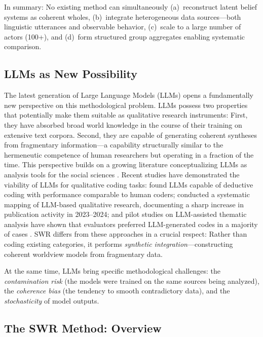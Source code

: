 \documentclass[11pt,a4paper]{article}
\theoremstyle{definition}
\theoremstyle{plain}
\theoremstyle{remark}
\begin{document}
In summary: No existing method can simultaneously (a)~reconstruct latent belief systems as coherent wholes, (b)~integrate heterogeneous data sources---both linguistic utterances and observable behavior, (c)~scale to a large number of actors (100+), and (d)~form structured group aggregates enabling systematic comparison.

\subsection{LLMs as New Possibility}
\label{sec:llms}

The latest generation of Large Language Models (LLMs) opens a fundamentally new perspective on this methodological problem. LLMs possess two properties that potentially make them suitable as qualitative research instruments: First, they have absorbed broad world knowledge in the course of their training on extensive text corpora. Second, they are capable of generating coherent syntheses from fragmentary information---a capability structurally similar to the hermeneutic competence of human researchers but operating in a fraction of the time. This perspective builds on a growing literature conceptualizing LLMs as analysis tools for the social sciences \citep{Ziems2024, Bail2024, Argyle2023}. Recent studies have demonstrated the viability of LLMs for qualitative coding tasks: \citet{Tai2024} found LLMs capable of deductive coding with performance comparable to human coders; \citet{Barros2024} conducted a systematic mapping of LLM-based qualitative research, documenting a sharp increase in publication activity in 2023--2024; and pilot studies on LLM-assisted thematic analysis have shown that evaluators preferred LLM-generated codes in a majority of cases \citep{Wang2025}. SWR differs from these approaches in a crucial respect: Rather than coding existing categories, it performs \emph{synthetic integration}---constructing coherent worldview models from fragmentary data.

At the same time, LLMs bring specific methodological challenges: the \emph{contamination risk} (the models were trained on the same sources being analyzed), the \emph{coherence bias} (the tendency to smooth contradictory data), and the \emph{stochasticity} of model outputs.

\subsection{The SWR Method: Overview}
\label{sec:overview}
\end{document}
